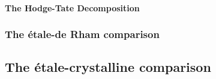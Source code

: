                     \begin{remark}
                        
                    \end{remark}
                
                \paragraph{The Hodge-Tate Decomposition}
            
            \subsubsection{The \'etale-de Rham comparison}
        
        \subsection{The \'etale-crystalline comparison}